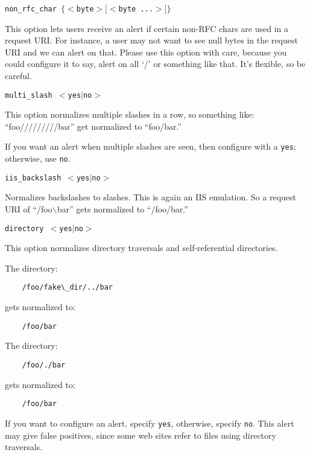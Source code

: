 \documentclass[english]{report}
\newcounter{slistnum}
\newenvironment{slist}
{ \begin{list}{ {\bf \arabic{slistnum}.} }{\usecounter{slistnum} } }
{ \end{list} }
\begin{document}
\begin{slist}
\item \texttt{non\_rfc\_char $\{ <$byte$> [<$byte ...$>] \}$}

This option lets users receive an alert if certain non-RFC chars are used in a
request URI.  For instance, a user may not want to see null bytes in the
request URI and we can alert on that.  Please use this option with care,
because you could configure it to say, alert on all `/' or something like that.
It's flexible, so be careful.

\item \texttt{multi\_slash $<$yes$|$no$>$}

This option normalizes multiple slashes in a row, so something like:
``foo/////////bar'' get normalized to ``foo/bar.''

If you want an alert when multiple slashes are seen, then configure with a
\texttt{yes}; otherwise, use \texttt{no}.

\item \texttt{iis\_backslash $<$yes$|$no$>$}

Normalizes backslashes to slashes.  This is again an IIS emulation.  So a
request URI of ``/foo$\backslash$bar'' gets normalized to ``/foo/bar.''

\item \texttt{directory $<$yes$|$no$>$}

This option normalizes directory traversals and self-referential directories.

The directory:

\begin{verbatim}
    /foo/fake\_dir/../bar
\end{verbatim}

gets normalized to:

\begin{verbatim}
    /foo/bar
\end{verbatim}

The directory:

\begin{verbatim}
    /foo/./bar
\end{verbatim}

gets normalized to:

\begin{verbatim}
    /foo/bar
\end{verbatim}

If you want to configure an alert, specify \texttt{yes}, otherwise, specify
\texttt{no}.  This alert may give false positives, since some web sites refer
to files using directory traversals.


\end{slist}
\end{document}

